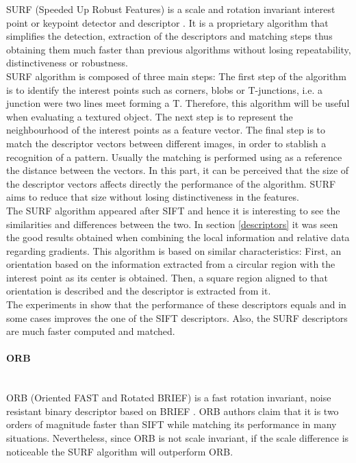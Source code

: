 SURF (Speeded Up Robust Features) is a scale and rotation invariant interest point or keypoint detector and descriptor \cite{surf}. 
It is a proprietary algorithm that simplifies the detection, extraction of the descriptors and matching steps thus obtaining them much faster than previous algorithms without losing repeatability, distinctiveness or robustness. 
\\
SURF algorithm is composed of three main steps: 
The first step of the algorithm is to identify the interest points such as corners, blobs or T-junctions, i.e. a junction were two lines meet forming a T. 
Therefore, this algorithm will be useful when evaluating a textured object.
The next step is to represent the neighbourhood of the interest points as a feature vector. 
The final step is to match the descriptor vectors between different images, in order to stablish a recognition of a pattern. Usually the matching is performed using as a reference the distance between the vectors. 
In this part, it can be perceived that the size of the descriptor vectors affects directly the performance of the algorithm. SURF aims to reduce that size without losing distinctiveness in the features. 
\\

The SURF algorithm appeared after SIFT and hence it is interesting to see the similarities and differences between the two. 
In section \ref{descriptors} it was seen the good results obtained when combining the local information and relative data regarding gradients. This algorithm is based on similar characteristics: 
First, an orientation based on the information extracted from a circular region with the interest point as its center is obtained. Then, a square region aligned to that orientation is described and the descriptor is extracted from it.  
\\

The experiments in \cite{surf} show that the performance of these descriptors equals and in some cases improves the one of the SIFT descriptors. Also, the SURF descriptors are much faster computed and matched. 


\paragraph{ORB}\mbox{}\\

ORB (Oriented FAST and Rotated BRIEF) is a fast rotation invariant, noise resistant binary descriptor based on BRIEF \cite{orb}.
ORB authors claim that it is two orders of magnitude faster than SIFT while matching its performance in many situations. 
Nevertheless, since ORB is not scale invariant, if the scale difference is noticeable the SURF algorithm will outperform ORB. 
\\

